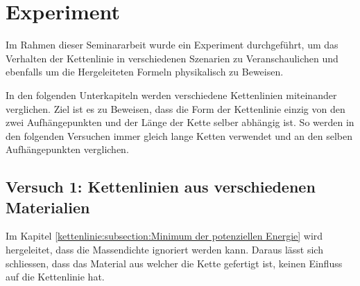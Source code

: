 %
%
%
%
\section{Experiment\label{kettenlinie:section:Experiment}}
Im Rahmen dieser Seminararbeit wurde ein Experiment durchgeführt, um das Verhalten der Kettenlinie in verschiedenen Szenarien zu Veranschaulichen und ebenfalls um die Hergeleiteten Formeln physikalisch zu Beweisen.

In den folgenden Unterkapiteln werden verschiedene Kettenlinien miteinander verglichen.
Ziel ist es zu Beweisen, dass die Form der Kettenlinie einzig von den zwei Aufhängepunkten und der Länge der Kette selber abhängig ist.
So werden in den folgenden Versuchen immer gleich lange Ketten verwendet und an den selben Aufhängepunkten verglichen.

\subsection{Versuch 1: Kettenlinien aus verschiedenen Materialien
\label{kettenlinie:subsection:massendichte}}
Im Kapitel \ref{kettenlinie:subsection:Minimum der potenziellen Energie} wird hergeleitet, dass die Massendichte ignoriert werden kann. Daraus lässt sich schliessen, dass das Material aus welcher die Kette gefertigt ist, keinen Einfluss auf die Kettenlinie hat.

